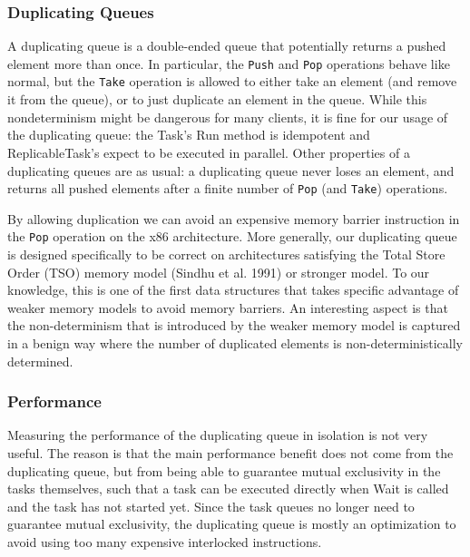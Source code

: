 \subsubsection{Duplicating Queues}

A duplicating queue is a double-ended queue that potentially returns a
pushed element more than once. In particular, the \lstinline!Push! and
\lstinline!Pop! operations behave like normal, but the
\lstinline!Take! operation is allowed to either take an element (and
remove it from the queue), or to just duplicate an element in the
queue. While this nondeterminism might be dangerous for many clients,
it is fine for our usage of the duplicating queue: the Task's Run
method is idempotent and ReplicableTask's expect to be executed in
parallel. Other properties of a duplicating queues are as usual: a
duplicating queue never loses an element, and returns all pushed
elements after a finite number of \lstinline!Pop! (and
\lstinline!Take!) operations.

By allowing duplication we can avoid an expensive memory barrier
instruction in the \lstinline!Pop! operation on the x86
architecture. More generally, our duplicating queue is designed
specifically to be correct on architectures satisfying the Total Store
Order (TSO) memory model (Sindhu et al. 1991) or stronger model. To
our knowledge, this is one of the first data structures that takes
specific advantage of weaker memory models to avoid memory
barriers. An interesting aspect is that the non-determinism that is
introduced by the weaker memory model is captured in a benign way
where the number of duplicated elements is non-deterministically
determined.

\subsubsection{Performance}

Measuring the performance of the duplicating queue in isolation is not
very useful. The reason is that the main performance benefit does not
come from the duplicating queue, but from being able to guarantee
mutual exclusivity in the tasks themselves, such that a task can be
executed directly when Wait is called and the task has not started
yet. Since the task queues no longer need to guarantee mutual
exclusivity, the duplicating queue is mostly an optimization to avoid
using too many expensive interlocked instructions.

